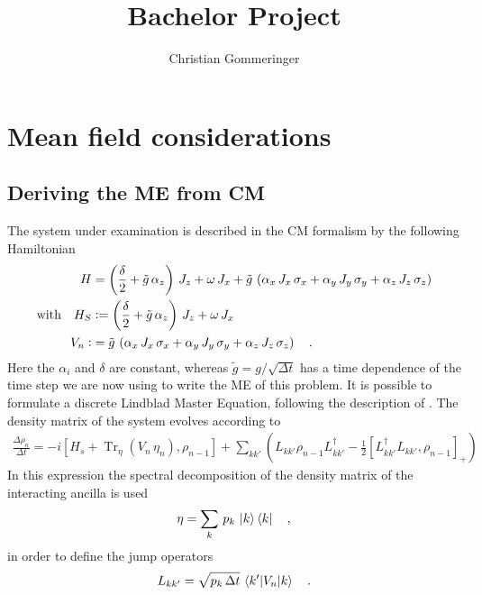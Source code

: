 \documentclass{article}
\title{Bachelor Project}
\author{Christian Gommeringer}
\begin{document}
\newcommand{\half}{\frac{1}{2}}
\newcommand{\Tr}{\operatorname{Tr}}
\newcommand{\Trs}[1]{\Tr_S\left\{#1\right\}}
\newcommand{\dt}{\frac{\text{d}}{\text{d}t}}
\newcommand{\tk}{\tilde{\kappa}}
\newcommand{\tw}{\tilde{\omega}}
\maketitle
\section*{Mean field considerations}
\subsection*{Deriving the ME from CM}
The system under examination is described in the CM formalism by the following Hamiltonian
\begin{align}\label{eq:Ham}
    H&=\left(\frac{\delta}{2}+\tilde{g}\,\alpha_z\right)\,J_z+\omega\,J_x+\tilde{g}\,\left(\alpha_x\,J_x\,\sigma_x+\alpha_y\,J_y\,\sigma_y+\alpha_z\,J_z\,\sigma_z\right)\notag\\
    \text{with}\quad{H_S}&\vcentcolon=\left(\frac{\delta}{2}+\tilde{g}\,\alpha_z\right)\,J_z+\omega\,J_x\\
    V_n\vcentcolon&=\tilde{g}\,\left(\alpha_x\,J_x\,\sigma_x+\alpha_y\,J_y\,\sigma_y+\alpha_z\,J_z\,\sigma_z\right)\quad.\notag
\end{align}
Here the $\alpha_i$ and $\delta$ are constant, whereas $\tilde{g}=g/\sqrt{\Delta{t}}$ has a time dependence of the time step we are now using to write the ME of this problem.
It is possible to formulate a discrete Lindblad Master Equation, following the description of \cite{overview}. The density matrix of the system evolves according to
\begin{align}\label{eq:ME}
\frac{\Delta \rho_n}{\Delta t} = -i[H_s + \operatorname{Tr}_\eta(V_n\,\eta_n), \rho_{n-1}] + \sum_{kk'} \left( L_{kk'} \rho_{n-1} L_{kk'}^\dagger - \frac{1}{2} \left[L_{kk'}^\dagger L_{kk'}, \rho_{n-1} \right]_+\right)
\end{align}
In this expression the spectral decomposition of the density matrix of the interacting ancilla is used
\begin{equation*}
    \eta=\sum_k\,p_k\,\ket{k}\bra{k}\quad,
\end{equation*}
in order to define the jump operators
\begin{equation*}
    L_{kk'}=\sqrt{p_k\,\Delta{t}}\,\braket{k'|V_n|k}\quad.
\end{equation*}
\end{document}
